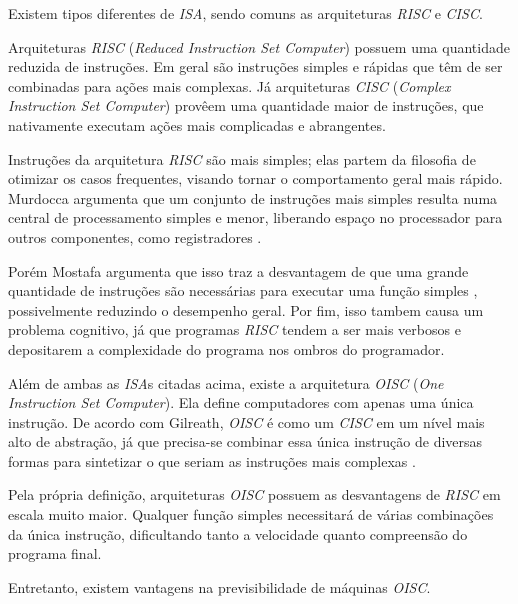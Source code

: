 Existem tipos diferentes de \textit{ISA}, sendo comuns as arquiteturas
\textit{RISC} e \textit{CISC}.

Arquiteturas \textit{RISC} (\textit{Reduced Instruction Set Computer}) possuem
uma quantidade reduzida de instruções. Em geral são instruções simples e rápidas
que têm de ser combinadas para ações mais complexas. Já arquiteturas
\textit{CISC} (\textit{Complex Instruction Set Computer}) provêem uma quantidade
maior de instruções, que nativamente executam ações mais complicadas e
abrangentes.

Instruções da arquitetura \textit{RISC} são mais simples; elas partem da
filosofia de otimizar os casos frequentes, visando tornar o comportamento geral
mais rápido. Murdocca argumenta que um conjunto de instruções mais simples
resulta numa central de processamento simples e menor, liberando espaço no
processador para outros componentes, como registradores \cite{principles}.

Porém Mostafa argumenta que isso traz a desvantagem de que uma grande quantidade
de instruções são necessárias para executar uma função simples \cite{mostafa},
possivelmente reduzindo o desempenho geral. Por fim, isso tambem causa um
problema cognitivo, já que programas \textit{RISC} tendem a ser mais verbosos e
depositarem a complexidade do programa nos ombros do programador.

Além de ambas as \textit{ISA}s citadas acima, existe a arquitetura \textit{OISC}
(\textit{One Instruction Set Computer}). Ela define computadores com apenas uma
única instrução. De acordo com Gilreath, \textit{OISC} é como um \textit{CISC}
em um nível mais alto de abstração, já que precisa-se combinar essa única
instrução de diversas formas para sintetizar o que seriam as instruções mais
complexas \cite{minimalist}.


Pela própria definição, arquiteturas \textit{OISC} possuem as desvantagens de
\textit{RISC} em escala muito maior. Qualquer função simples necessitará de
várias combinações da única instrução, dificultando tanto a velocidade quanto
compreensão do programa final.

Entretanto, existem vantagens na previsibilidade de máquinas \textit{OISC}.


